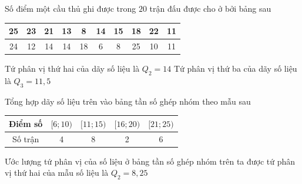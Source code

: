 \begin{ex}%
 Số điểm một cầu thủ ghi được trong $20$ trận đấu được cho  ở bởi bảng sau
 \begin{center}
  \begin{tabular}{|c|c|c|c|c|c|c|c|c|c|}
   \hline 
   25  & 23 & 21 & 13 & 8 & 14 & 15 & 18 & 22 & 11 \\
    \hline
    24 & 12 & 14 & 14 & 18 & 6 & 8 & 25 &10 & 11\\
   \hline 
  \end{tabular}
 \end{center}
  \choiceTF
  {\True Tứ phân  vị thứ hai của dãy số liệu là $Q_2= 14$}
  {Tứ phân vị thứ ba của dãy  số liệu là $Q_3= 11{,}5$}
  {Tổng hợp dãy số liệu trên vào bảng  tần số ghép nhóm theo mẫu sau
  \begin{tabular}{|c|c|c|c|c|}
   \hline 
   Điểm số & $[6;10)$ & $[11; 15)$ & $[16; 20)$ &  $[21;25)$\\
    \hline
   Số trận & 4 & 8  & 2 & 6\\
    \hline
 \end{tabular}}
 {Ước lượng tứ phân vị của số liệu ở bảng tần số ghép nhóm trên ta được tứ phân vị thứ hai của mẫu số liệu là  $Q_2=8{,}25$}
\end{ex}

